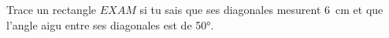 %
%
    Trace un rectangle \(EXAM\) si tu sais que ses diagonales mesurent \SI{6}{cm} et que l'angle aigu entre ses diagonales est de \ang{50}.
